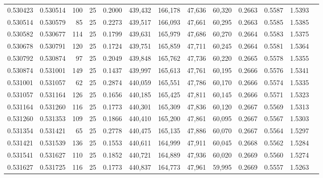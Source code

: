 \begin{tabular}{rrrrrrrrrrrrr}
0.530423 & 0.530514 &   100 &  25 &                                     0.2000 & 439,432 & 166,178 &  47,636 &  60,320 & 0.2663 & 0.5587 & 1.5393 \\
0.530514 & 0.530579 &    85 &  25 &                                     0.2273 & 439,517 & 166,093 &  47,661 &  60,295 & 0.2663 & 0.5585 & 1.5385 \\
0.530582 & 0.530677 &   114 &  25 &                                     0.1799 & 439,631 & 165,979 &  47,686 &  60,270 & 0.2664 & 0.5583 & 1.5375 \\
0.530678 & 0.530791 &   120 &  25 &                                     0.1724 & 439,751 & 165,859 &  47,711 &  60,245 & 0.2664 & 0.5581 & 1.5364 \\
0.530792 & 0.530874 &    97 &  25 &                                     0.2049 & 439,848 & 165,762 &  47,736 &  60,220 & 0.2665 & 0.5578 & 1.5355 \\
0.530874 & 0.531001 &   149 &  25 &                                     0.1437 & 439,997 & 165,613 &  47,761 &  60,195 & 0.2666 & 0.5576 & 1.5341 \\
0.531001 & 0.531057 &    62 &  25 &                                     0.2874 & 440,059 & 165,551 &  47,786 &  60,170 & 0.2666 & 0.5574 & 1.5335 \\
0.531057 & 0.531164 &   126 &  25 &                                     0.1656 & 440,185 & 165,425 &  47,811 &  60,145 & 0.2666 & 0.5571 & 1.5323 \\
0.531164 & 0.531260 &   116 &  25 &                                     0.1773 & 440,301 & 165,309 &  47,836 &  60,120 & 0.2667 & 0.5569 & 1.5313 \\
0.531260 & 0.531353 &   109 &  25 &                                     0.1866 & 440,410 & 165,200 &  47,861 &  60,095 & 0.2667 & 0.5567 & 1.5303 \\
0.531354 & 0.531421 &    65 &  25 &                                     0.2778 & 440,475 & 165,135 &  47,886 &  60,070 & 0.2667 & 0.5564 & 1.5297 \\
0.531421 & 0.531539 &   136 &  25 &                                     0.1553 & 440,611 & 164,999 &  47,911 &  60,045 & 0.2668 & 0.5562 & 1.5284 \\
0.531541 & 0.531627 &   110 &  25 &                                     0.1852 & 440,721 & 164,889 &  47,936 &  60,020 & 0.2669 & 0.5560 & 1.5274 \\
0.531627 & 0.531725 &   116 &  25 &                                     0.1773 & 440,837 & 164,773 &  47,961 &  59,995 & 0.2669 & 0.5557 & 1.5263 \\

\end{tabular}
